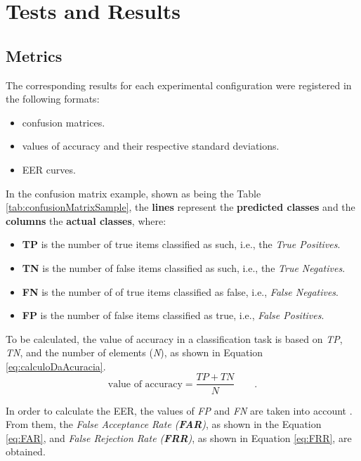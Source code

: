 \section{Tests and Results}
\label{sec:testsResults}
\subsection{Metrics}
\par The corresponding results for each experimental configuration were registered in the following formats:
		\begin{itemize}
			\item{} confusion matrices.
			\item{} values of accuracy and their respective standard deviations.
			\item{} EER curves.
		\end{itemize}
\par In the confusion matrix example, shown as being the Table \ref{tab:confusionMatrixSample}, the \textbf{lines} represent the \textbf{predicted classes} and the \textbf{columns} the \textbf{actual classes}, where:
\begin{itemize}
			\item{}\textbf{TP} is the number of true items classified as such, i.e., the \textit{True Positives}.
			\item{}\textbf{TN} is the number of false items classified as such, i.e., the \textit{True Negatives}.
			\item{}\textbf{FN} is the number of of true items classified as false, i.e., \textit{False Negatives}.
			\item{}\textbf{FP} is the number of false items classified as true, i.e., \textit{False Positives}.
		\end{itemize}

To be calculated, the value of accuracy in a classification task is based on \textit{TP}, \textit{TN}, and the number of elements (\textit{N}), as shown in Equation \ref{eq:calculoDaAcuracia}.
\begin{equation}
\text{value of accuracy} = \dfrac{TP + TN}{N} \qquad.
\label{eq:calculoDaAcuracia}
\end{equation}
\par In order to calculate the EER, the values of \textit{FP} and \textit{FN} are taken into account \cite{ghazali2018recent}. From them, the \textit{False Acceptance Rate (\textbf{FAR})}, as shown in the Equation \ref{eq:FAR}, and \textit{False Rejection Rate (\textbf{FRR})}, as shown in Equation \ref{eq:FRR}, are obtained.
